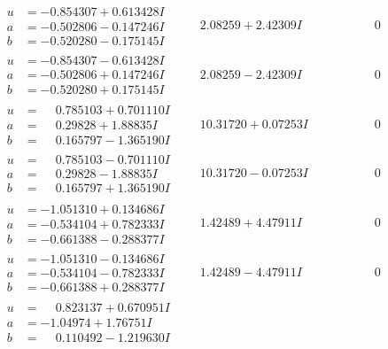 \documentclass[1p]{elsarticle_modified}
\theoremstyle{definition}
\begin{document}
$$\begin{array}{c|c|c}
\begin{aligned}
u &= -0.854307 + 0.613428 I \\
a &= -0.502806 - 0.147246 I \\
b &= -0.520280 - 0.175145 I\end{aligned}
 & \phantom{-}2.08259 + 2.42309 I & \phantom{-0.000000 } 0 \\ \hline\begin{aligned}
u &= -0.854307 - 0.613428 I \\
a &= -0.502806 + 0.147246 I \\
b &= -0.520280 + 0.175145 I\end{aligned}
 & \phantom{-}2.08259 - 2.42309 I & \phantom{-0.000000 } 0 \\ \hline\begin{aligned}
u &= \phantom{-}0.785103 + 0.701110 I \\
a &= \phantom{-}0.29828 + 1.88835 I \\
b &= \phantom{-}0.165797 - 1.365190 I\end{aligned}
 & \phantom{-}10.31720 + 0.07253 I & \phantom{-0.000000 } 0 \\ \hline\begin{aligned}
u &= \phantom{-}0.785103 - 0.701110 I \\
a &= \phantom{-}0.29828 - 1.88835 I \\
b &= \phantom{-}0.165797 + 1.365190 I\end{aligned}
 & \phantom{-}10.31720 - 0.07253 I & \phantom{-0.000000 } 0 \\ \hline\begin{aligned}
u &= -1.051310 + 0.134686 I \\
a &= -0.534104 + 0.782333 I \\
b &= -0.661388 - 0.288377 I\end{aligned}
 & \phantom{-}1.42489 + 4.47911 I & \phantom{-0.000000 } 0 \\ \hline\begin{aligned}
u &= -1.051310 - 0.134686 I \\
a &= -0.534104 - 0.782333 I \\
b &= -0.661388 + 0.288377 I\end{aligned}
 & \phantom{-}1.42489 - 4.47911 I & \phantom{-0.000000 } 0 \\ \hline\begin{aligned}
u &= \phantom{-}0.823137 + 0.670951 I \\
a &= -1.04974 + 1.76751 I \\
b &= \phantom{-}0.110492 - 1.219630 I\end{aligned}

\end{array}$$
\end{document}
